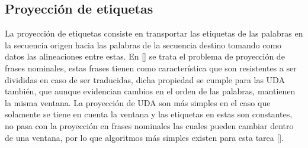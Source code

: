 \subsection{Proyección de etiquetas}

La proyección de etiquetas consiste en transportar las etiquetas de las palabras en la secuencia origen
hacia las palabras de la secuencia destino tomando como datos las alineaciones entre estas. En [\cite{yarowsky2001inducing}]
se trata el problema de proyección de frases nominales, estas frases tienen como característica que son resistentes
a ser divididas en caso de ser traducidas, dicha propiedad se cumple para las UDA también, que aunque evidencian 
cambios en el orden de las palabras, mantienen la misma ventana. La proyección de UDA son más simples en el caso
que solamente se tiene en cuenta la ventana y las etiquetas en estas son constantes, no pasa con la proyección en
frases nominales las cuales pueden cambiar dentro de una ventana, por lo que algoritmos más simples existen
para esta tarea [\cite{eger2018cross}].  







